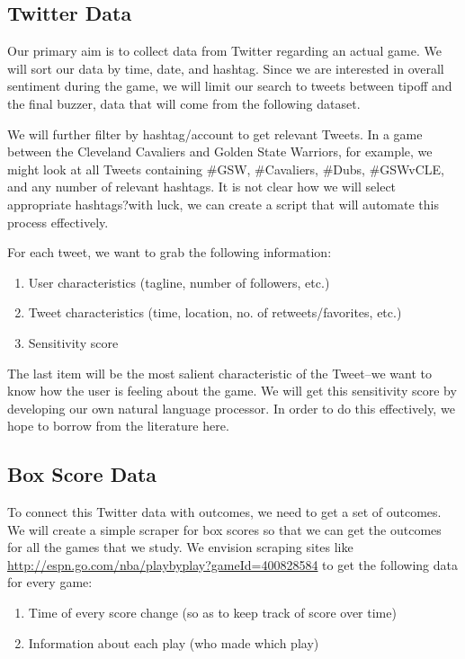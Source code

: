 \documentclass[12pt]{article}
\begin{document}
\subsection{Twitter Data}

Our primary aim is to collect data from Twitter regarding an actual game. We will sort our data by time, date, and hashtag. Since we are interested in overall sentiment during the game, we will limit our search to tweets between tipoff and the final buzzer, data that will come from the following dataset. 

We will further filter by hashtag/account to get relevant Tweets. In a game between the Cleveland Cavaliers and Golden State Warriors, for example, we might look at all Tweets containing \#GSW, \#Cavaliers, \#Dubs, \#GSWvCLE, and any number of relevant hashtags. It is not clear how we will select appropriate hashtags?with luck, we can create a script that will automate this process effectively. 

For each tweet, we want to grab the following information:
\begin{enumerate}
	\item User characteristics (tagline, number of followers, etc.)
	\item Tweet characteristics (time, location, no. of retweets/favorites, etc.)
	\item Sensitivity score
\end{enumerate}

\noindent
The last item will be the most salient characteristic of the Tweet--we want to know how the user is feeling about the game. We will get this sensitivity score by developing our own natural language processor. In order to do this effectively, we hope to borrow from the literature here.

\subsection{Box Score Data}

To connect this Twitter data with outcomes, we need to get a set of outcomes. We will create a simple scraper for box scores so that we can get the outcomes for all the games that we study. We envision scraping sites like \url{http://espn.go.com/nba/playbyplay?gameId=400828584} to get the following data for every game:
\begin{enumerate}
	\item Time of every score change (so as to keep track of score over time)
	\item Information about each play (who made which play)
\end{enumerate}
\end{document}

